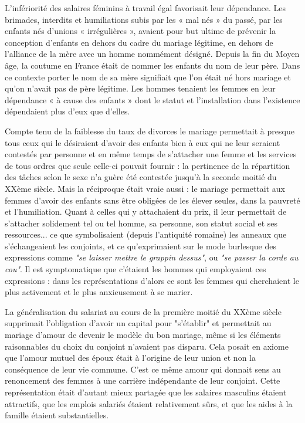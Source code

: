 L'infériorité des salaires féminins à travail égal favorisait leur dépendance. Les brimades, interdits et humiliations subis par les « mal nés » du passé, par les enfants nés d'unions « irrégulières »,  avaient pour but ultime de prévenir la conception d'enfants en dehors du cadre du mariage légitime, en dehors de l'alliance de la mère avec un homme nommément désigné. Depuis la fin du Moyen âge, la coutume en France était de nommer les enfants du nom de leur père. Dans ce contexte porter le nom de sa mère signifiait que l'on était né hors mariage et qu'on n'avait pas de père légitime. Les hommes tenaient les femmes en leur dépendance « à cause des enfants » dont le statut et l'installation dans l'existence dépendaient plus d'eux que d'elles. 

Compte tenu de la faiblesse du taux de divorces le mariage permettait à presque tous ceux qui le désiraient d'avoir des enfants bien à eux qui ne leur seraient contestés par personne et en même temps de s'attacher une femme et les services de tous ordres que seule celle-ci pouvait fournir : la pertinence de la répartition des tâches selon le sexe n'a guère été contestée jusqu'à la seconde moitié du XXème siècle. Mais la réciproque était vraie aussi : le mariage permettait aux femmes d'avoir des enfants sans être obligées de les élever seules, dans la pauvreté et l'humiliation. Quant à celles qui y attachaient du prix, il leur permettait de s'attacher solidement tel ou tel homme, sa personne, son statut social et ses ressources... ce que symbolisaient (depuis l'antiquité romaine) les anneaux que s'échangeaient les conjoints, et ce qu'exprimaient sur le mode burlesque des expressions comme {\emph{"se laisser mettre le grappin dessus"}}, ou {\emph{"se passer la corde au cou"}}. Il est symptomatique que c'étaient les hommes qui employaient ces expressions : dans les représentations d'alors ce sont les femmes qui cherchaient le plus activement et le plus anxieusement à se marier.


 La généralisation du salariat au cours de la première moitié du XXème siècle supprimait l'obligation d'avoir un capital pour "s'établir" et permettait au mariage d'amour de devenir le modèle du bon mariage, même si les éléments raisonnables du choix du conjoint n'avaient pas disparu. Cela posait en axiome que l'amour mutuel des époux était à l'origine de leur union et non la conséquence de leur vie commune. C'est ce même amour qui donnait sens au renoncement des femmes à une carrière indépendante de leur conjoint. Cette représentation était d'autant mieux  partagée que les salaires masculins étaient attractifs, que les emplois salariés étaient relativement sûrs, et que les aides à la famille étaient substantielles.
 

